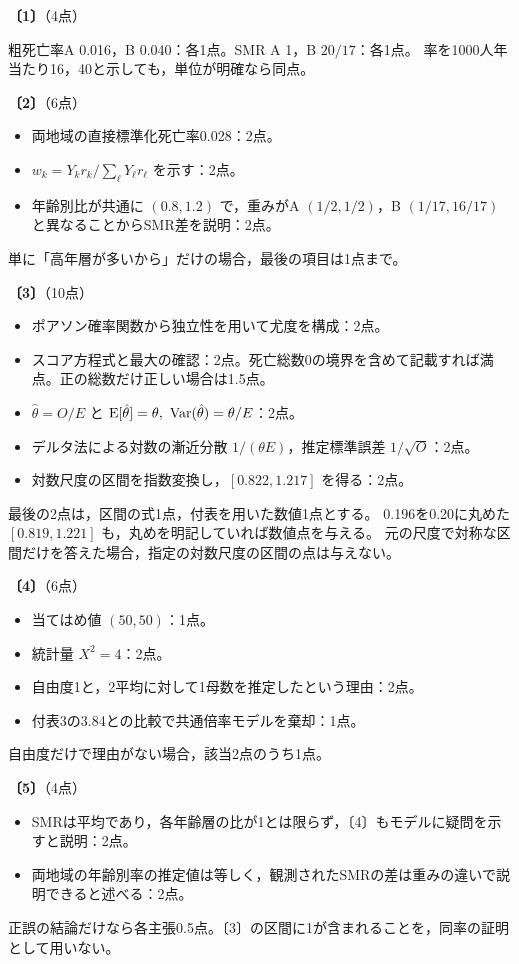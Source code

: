 \documentclass[a4paper,11pt]{ltjsarticle}
\renewcommand{\ans}[1]{\par\medskip\noindent\textbf{〔#1〕}\quad}
\renewcommand{\points}[1]{\hfill\textnormal{（#1点）}\par\nobreak}
\begin{document}
\ans{1}\points{4}
粗死亡率A 0.016，B 0.040：各1点。SMR A 1，B $20/17$：各1点。
率を1000人年当たり16，40と示しても，単位が明確なら同点。

\ans{2}\points{6}
\begin{itemize}
\item 両地域の直接標準化死亡率0.028：2点。
\item $w_k=Y_kr_k/\sum_\ell Y_\ell r_\ell$ を示す：2点。
\item 年齢別比が共通に $(0.8,1.2)$ で，重みがA $(1/2,1/2)$，B $(1/17,16/17)$ と異なることからSMR差を説明：2点。
\end{itemize}
単に「高年層が多いから」だけの場合，最後の項目は1点まで。

\ans{3}\points{10}
\begin{itemize}
\item ポアソン確率関数から独立性を用いて尤度を構成：2点。
\item スコア方程式と最大の確認：2点。死亡総数0の境界を含めて記載すれば満点。正の総数だけ正しい場合は1.5点。
\item $\hat\theta=O/E$ と $\E[\hat\theta]=\theta,\ \Var(\hat\theta)=\theta/E$：2点。
\item デルタ法による対数の漸近分散 $1/(\theta E)$，推定標準誤差 $1/\sqrt O$：2点。
\item 対数尺度の区間を指数変換し，$[0.822,1.217]$ を得る：2点。
\end{itemize}
最後の2点は，区間の式1点，付表を用いた数値1点とする。
0.196を0.20に丸めた $[0.819,1.221]$ も，丸めを明記していれば数値点を与える。
元の尺度で対称な区間だけを答えた場合，指定の対数尺度の区間の点は与えない。

\ans{4}\points{6}
\begin{itemize}
\item 当てはめ値 $(50,50)$：1点。
\item 統計量 $X^2=4$：2点。
\item 自由度1と，2平均に対して1母数を推定したという理由：2点。
\item 付表3の3.84との比較で共通倍率モデルを棄却：1点。
\end{itemize}
自由度だけで理由がない場合，該当2点のうち1点。

\ans{5}\points{4}
\begin{itemize}
\item SMRは平均であり，各年齢層の比が1とは限らず，〔4〕もモデルに疑問を示すと説明：2点。
\item 両地域の年齢別率の推定値は等しく，観測されたSMRの差は重みの違いで説明できると述べる：2点。
\end{itemize}
正誤の結論だけなら各主張0.5点。〔3〕の区間に1が含まれることを，同率の証明として用いない。
\newpage
\end{document}
